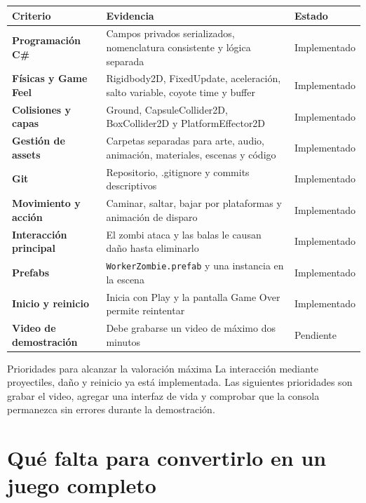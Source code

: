 \documentclass[11pt,a4paper]{article}
\begin{document}
\begin{tabularx}{\textwidth}{>{\bfseries}p{}X p{}}
\toprule
Criterio & Evidencia & Estado \\
\midrule
Programación C\# & Campos privados serializados, nomenclatura consistente y lógica separada & Implementado \\
Físicas y Game Feel & Rigidbody2D, FixedUpdate, aceleración, salto variable, coyote time y buffer & Implementado \\
Colisiones y capas & Ground, CapsuleCollider2D, BoxCollider2D y PlatformEffector2D & Implementado \\
Gestión de assets & Carpetas separadas para arte, audio, animación, materiales, escenas y código & Implementado \\
Git & Repositorio, .gitignore y commits descriptivos & Implementado \\
Movimiento y acción & Caminar, saltar, bajar por plataformas y animación de disparo & Implementado \\
Interacción principal & El zombi ataca y las balas le causan daño hasta eliminarlo & Implementado \\
Prefabs & \texttt{WorkerZombie.prefab} y una instancia en la escena & Implementado \\
Inicio y reinicio & Inicia con Play y la pantalla Game Over permite reintentar & Implementado \\
Video de demostración & Debe grabarse un video de máximo dos minutos & Pendiente \\
\bottomrule
\end{tabularx}

\begin{warningbox}{Prioridades para alcanzar la valoración máxima}
La interacción mediante proyectiles, daño y reinicio ya está implementada. Las siguientes prioridades son grabar el video, agregar una interfaz de vida y comprobar que la consola permanezca sin errores durante la demostración.
\end{warningbox}

\section{Qué falta para convertirlo en un juego completo}
\end{document}
